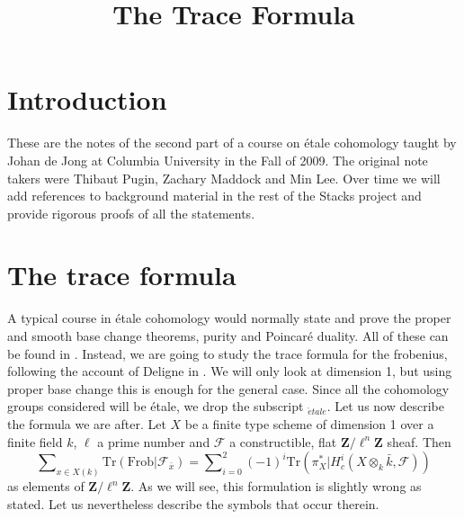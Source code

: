 \documentclass{stacks-project}
\theoremstyle{plain}
\theoremstyle{definition}
\theoremstyle{remark}
\numberwithin{equation}{subsection}
\def\etale{{\acute{e}tale}}
\begin{document}
\title{The Trace Formula}


\maketitle

\label{section-phantom}

\tableofcontents


\section{Introduction}
\label{section-introduction}

\noindent
These are the notes of the second part of a course on \'etale cohomology
taught by Johan de Jong at Columbia University in the Fall of 2009. The
original note takers were Thibaut Pugin, Zachary Maddock and Min Lee.
Over time we will add references to background material in the rest of the
Stacks project and provide rigorous proofs of all the statements.









\section{The trace formula}
\label{section-trace-formula}

\noindent
A typical course in \'etale cohomology would normally state and prove the
proper and smooth base change theorems, purity and Poincar\'e duality. All of
these can be found in \cite[Arcata]{SGA4.5}. Instead, we are going to study the
trace formula for the frobenius, following the account of Deligne in
\cite[Rapport]{SGA4.5}. We will only look at dimension 1, but using proper base
change this is enough for the general case. Since all the cohomology groups
considered will be \'etale, we drop the subscript $_\etale$. Let us
now describe
the formula we are after. Let $X$ be a finite type scheme of dimension 1 over a
finite field $k$, $\ell$ a prime number and $\mathcal{F}$ a constructible, flat
$\mathbf{Z}/\ell^n\mathbf{Z}$ sheaf. Then
\begin{equation}
\label{equation-trace-formula-initial}
\sum\nolimits_{x \in X(k)}
\text{Tr}(\text{Frob} | \mathcal{F}_{\bar x}) =
\sum\nolimits_{i = 0}^2
(-1)^i \text{Tr}(\pi_X^* | H^i_c(X \otimes_k \bar k, \mathcal{F}))
\end{equation}
as elements of $\mathbf{Z}/\ell^n\mathbf{Z}$. As we will see, this formulation
is slightly wrong as stated. Let us nevertheless describe the symbols that
occur therein.
\end{document}
